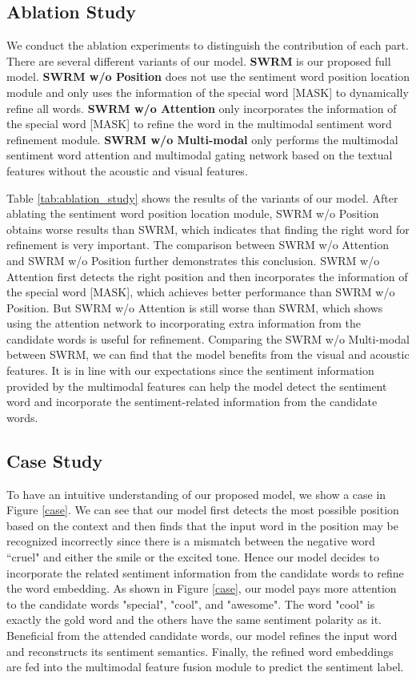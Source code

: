 \documentclass[11pt]{article}
\begin{document}
\subsection{Ablation Study}
We conduct the ablation experiments to distinguish the contribution of each part. There are several different variants of our model. \textbf{SWRM} is our proposed full model. \textbf{SWRM w/o Position} does not use the sentiment word position location module and only uses the information of the special word [MASK] to dynamically refine all words. \textbf{SWRM w/o Attention} only incorporates the information of the special word [MASK] to refine the word in the multimodal sentiment word refinement module. \textbf{SWRM w/o Multi-modal} only performs the multimodal sentiment word attention and multimodal gating network based on the textual features without the acoustic and visual features. 

Table \ref{tab:ablation_study} shows the results of the variants of our model. After ablating the sentiment word position location module, SWRM w/o Position obtains worse results than SWRM, which indicates that finding the right word for refinement is very important. The comparison between SWRM w/o Attention and SWRM w/o Position further demonstrates this conclusion. SWRM w/o Attention first detects the right position and then incorporates the information of the special word [MASK], which achieves better performance than SWRM w/o Position. But SWRM w/o Attention is still worse than SWRM, which shows using the attention network to incorporating extra information from the candidate words is useful for refinement. Comparing the SWRM w/o Multi-modal between SWRM, we can find that the model benefits from the visual and acoustic features. It is in line with our expectations since the sentiment information provided by the multimodal features can help the model detect the sentiment word and incorporate the sentiment-related information from the candidate words. 




\subsection{Case Study}
To have an intuitive understanding of our proposed model, we show a case in Figure \ref{case}. We can see that our model first detects the most possible position based on the context and then finds that the input word in the position may be recognized incorrectly since there is a mismatch between the negative word ``cruel" and either the smile or the excited tone. Hence our model decides to incorporate the related sentiment information from the candidate words to refine the word embedding. As shown in Figure \ref{case}, our model pays more attention to the candidate words "special", "cool", and "awesome". The word "cool" is exactly the gold word and the others have the same sentiment polarity as it. Beneficial from the attended candidate words, our model refines the input word and reconstructs its sentiment semantics. Finally, the refined word embeddings are fed into the multimodal feature fusion module to predict the sentiment label.
\end{document}
